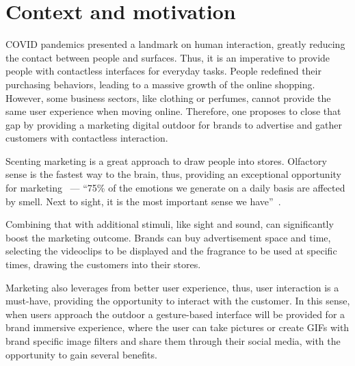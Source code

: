 \section{Context and motivation}
\label{sec:context-motivation}
COVID pandemics presented a landmark on human interaction, greatly reducing the
contact between people and surfaces. Thus, it is an imperative to provide people
with contactless interfaces for everyday tasks. People redefined their
purchasing behaviors, leading to a massive growth of the online
shopping. However, some business sectors, like clothing or perfumes, cannot
provide the same user experience when moving online.
Therefore, one proposes to close that gap by providing a marketing digital
outdoor for brands to advertise and gather customers with contactless
interaction.

Scenting marketing is a great approach to draw people into stores.
Olfactory sense is the fastest way to the brain, thus, providing an exceptional
opportunity for marketing~\cite{news-harvard} --- ``75\% of the emotions we generate on a daily basis are affected by smell. Next
to sight, it is the most important sense we have''~\cite{lindstrom2006brand}.

Combining that with additional stimuli, like sight and sound, can
significantly boost the marketing outcome. Brands can buy advertisement space
and time, selecting the videoclips to be displayed and the fragrance to be
used at specific times, drawing the customers into their stores.

Marketing also leverages from better user experience, thus, user interaction is
a must-have, providing the opportunity to interact with the customer. In this
sense, when users approach the outdoor a gesture-based interface will be
provided for a brand immersive experience, where the user can take pictures or
create GIFs with brand specific image filters and share them through their
social media, with the opportunity to gain several benefits.

